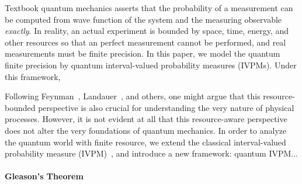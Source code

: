 \documentclass[english,reprint, aps, prl,superscriptaddress, showpacs,
showkeys, longbibliography, amsmath, amssymb]{revtex4-1}
\theoremstyle{plain}
\theoremstyle{definition}
\begin{document}
\maketitle

Textbook quantum mechanics asserts that the probability of a measurement
can be computed from wave function of the system and the measuring
observable \emph{exactly}. In reality, an actual experiment is bounded
by space, time, energy, and other resources so that an perfect measurement
cannot be performed, and real measurements must be finite precision.
In this paper, we model the quantum finite precision by quantum interval-valued
probability measures (IVPMs). Under this framework, 

Following Feynman~\cite{Feynman1982Simulating}, Landauer~\cite{Landauer1996188},
and others, one might argue that this resource-bounded perspective
is also crucial for understanding the very nature of physical processes.
However, it is not evident at all that this resource-aware perspective
does not alter the very foundations of quantum mechanics. In order
to analyze the quantum world with finite resource, we extend the classical
interval-valued probability measure (IVPM)~\cite{JamisonLodwick2004},
and introduce a new framework: quantum IVPM...\newpage{}

\paragraph{Gleason's Theorem}
\end{document}
